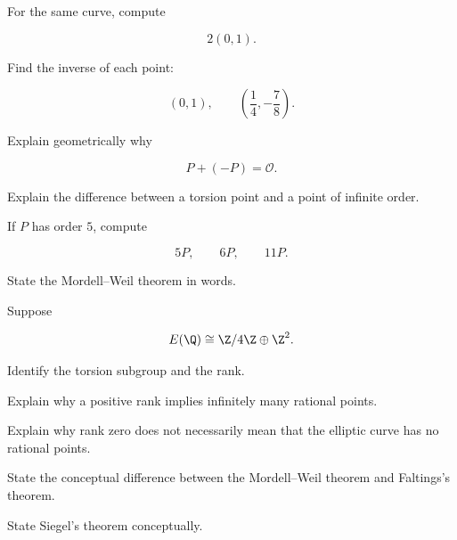 \begin{exercise}[2]
For the same curve, compute

\[ 2(0,1). \]
\end{exercise}

\begin{exercise}[2]
Find the inverse of each point:

\[
(0,1),\qquad
\left(\frac14,-\frac78\right).
\]
\end{exercise}

\begin{exercise}[2]
Explain geometrically why

\[ P+(-P)=\mathcal O. \]
\end{exercise}

\begin{exercise}[2]
Explain the difference between a torsion point and a point of infinite
order.
\end{exercise}

\begin{exercise}[2]
If \(P\) has order \(5\), compute

\[ 5P,\qquad6P,\qquad11P. \]
\end{exercise}

\begin{exercise}[2]
State the Mordell--Weil theorem in words.
\end{exercise}

\begin{exercise}[2]
Suppose

\[ E(\Q)\cong\Z/4\Z\oplus\Z^2. \]

Identify the torsion subgroup and the rank.
\end{exercise}

\begin{exercise}[2]
Explain why a positive rank implies infinitely many rational points.
\end{exercise}

\begin{exercise}[2]
Explain why rank zero does not necessarily mean that the elliptic curve has
no rational points.
\end{exercise}

\begin{exercise}[2]
State the conceptual difference between the Mordell--Weil theorem and
Faltings's theorem.
\end{exercise}

\begin{exercise}[2]
State Siegel's theorem conceptually.
\end{exercise}

